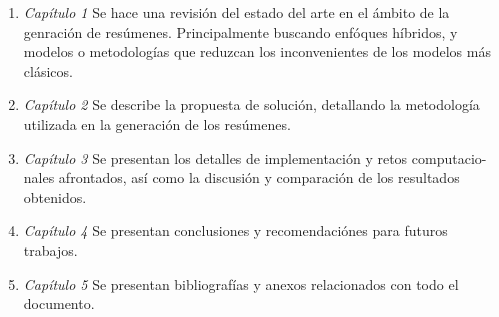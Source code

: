         \begin{enumerate}
            \item \emph{Capítulo 1} Se hace una revisión del estado del arte en el ámbito de la genración de resúmenes. Principalmente buscando enfóques híbridos, y modelos o metodologías que reduzcan los inconvenientes de los modelos más clásicos.
            \item \emph{Capítulo 2} Se describe la propuesta de solución, detallando la metodología utilizada en la generación de los resúmenes.
            \item \emph{Capítulo 3} Se presentan los detalles de implementación y retos computacio-
            nales afrontados, así como la discusión y comparación de los resultados obtenidos.
            \item \emph{Capítulo 4} Se presentan conclusiones y recomendaciónes para futuros trabajos.
            \item \emph{Capítulo 5} Se presentan bibliografías y anexos relacionados con todo el documento.
        \end{enumerate}


